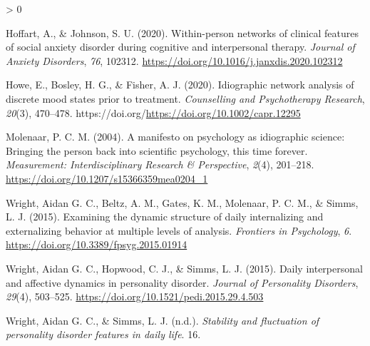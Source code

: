 \documentclass[
  english,
  man]{apa6}
\newlength{\cslhangindent}
\newenvironment{CSLReferences}[2] %
 {%
  \setlength{\parindent}{0pt}
  \ifodd #1 \everypar{\setlength{\hangindent}{\cslhangindent}}\ignorespaces\fi
  \ifnum #2 > 0
  \setlength{\parskip}{#2\baselineskip}
  \fi
 }%
 {}
\begin{document}
\begin{CSLReferences}{1}{0}
\leavevmode\hypertarget{ref-HoffartJohnson2020}{}%
Hoffart, A., \& Johnson, S. U. (2020). Within-person networks of clinical features of social anxiety disorder during cognitive and interpersonal therapy. \emph{Journal of Anxiety Disorders}, \emph{76}, 102312. \url{https://doi.org/10.1016/j.janxdis.2020.102312}

\leavevmode\hypertarget{ref-HoweEtAl2020}{}%
Howe, E., Bosley, H. G., \& Fisher, A. J. (2020). Idiographic network analysis of discrete mood states prior to treatment. \emph{Counselling and Psychotherapy Research}, \emph{20}(3), 470--478. https://doi.org/\url{https://doi.org/10.1002/capr.12295}

\leavevmode\hypertarget{ref-Molenaar2004}{}%
Molenaar, P. C. M. (2004). A manifesto on psychology as idiographic science: Bringing the person back into scientific psychology, this time forever. \emph{Measurement: Interdisciplinary Research \& Perspective}, \emph{2}(4), 201--218. \url{https://doi.org/10.1207/s15366359mea0204_1}

\leavevmode\hypertarget{ref-WrightEtAl2015a}{}%
Wright, Aidan G. C., Beltz, A. M., Gates, K. M., Molenaar, P. C. M., \& Simms, L. J. (2015). Examining the dynamic structure of daily internalizing and externalizing behavior at multiple levels of analysis. \emph{Frontiers in Psychology}, \emph{6}. \url{https://doi.org/10.3389/fpsyg.2015.01914}

\leavevmode\hypertarget{ref-WrightEtAl2015}{}%
Wright, Aidan G. C., Hopwood, C. J., \& Simms, L. J. (2015). Daily interpersonal and affective dynamics in personality disorder. \emph{Journal of Personality Disorders}, \emph{29}(4), 503--525. \url{https://doi.org/10.1521/pedi.2015.29.4.503}

\leavevmode\hypertarget{ref-WrightSimms}{}%
Wright, Aidan G. C., \& Simms, L. J. (n.d.). \emph{Stability and fluctuation of personality disorder features in daily life}. 16.

\end{CSLReferences}

\endgroup
\end{document}
